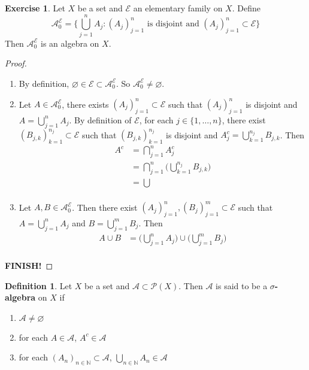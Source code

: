 \documentclass[12pt]{amsart}
\theoremstyle{definition}
\newtheorem{defn}[definition]{Definition}
\newtheorem{ex}[definition]{Exercise}
\newcommand{\N}{\mathbb{N}}
\newcommand{\MA}{\mathcal{A}}
\newcommand{\MP}{\mathcal{P}}
\newcommand{\ME}{\mathcal{E}}
\newcommand{\lex}[1]{\label{ex:#1}}
\newcommand{\ld}[1]{\label{defn:#1}}
\begin{document}
	\begin{ex} \lex{00000} 
	Let $X$ be a set and $\ME$ an elementary family on $X$. Define $$\MA^{\ME}_0 = \bigg \{ \bigcup_{j=1}^n A_j: (A_j)_{j=1}^n \text{ is disjoint and } (A_j)_{j=1}^n \subset \ME \bigg \}$$ Then $\MA^{\ME}_0$ is an algebra on $X$.
	\end{ex}	
	
	\begin{proof}\
	\begin{enumerate}
	\item By definition, $\varnothing \in \ME \subset \MA^{\ME}_0$. So $\MA^{\ME}_0 \neq \varnothing$. 
	\item Let $A \in \MA^{\ME}_0$, there exists $(A_j)_{j=1}^n \subset \ME$ such that $(A_j)_{j=1}^n$ is disjoint and $A = \bigcup\limits_{j =1}^n A_j$. By definition of $\ME$, for each $j \in \{1, \ldots, n\}$, there exist $(B_{j,k})_{k=1}^{n_j} \subset \ME$ such that $(B_{j,k})_{k=1}^{n_j}$ is disjoint and $A_j^c = \bigcup\limits_{k=1}^{n_j}B_{j,k}$. Then 
	\begin{align*}
	A^c 
	&= \bigcap_{j=1}^n A_j^c \\
	&= \bigcap_{j=1}^n \bigg( \bigcup\limits_{k=1}^{n_j}B_{j,k} \bigg)\\
	&= \bigcup\\
\end{align*}	 
	\item Let $A, B \in \MA^{\ME}_0$. Then there exist $(A_j)_{j=1}^n, (B_j)_{j=1}^m \subset \ME$ such that $A = \bigcup\limits_{j=1}^n A_j$ and  $B = \bigcup\limits_{j=1}^m B_j$. Then 
	\begin{align*}
	A \cup B 
	&=  \bigg( \bigcup\limits_{j=1}^n A_j \bigg) \cup \bigg( \bigcup\limits_{j=1}^m B_j \bigg) \\
	\end{align*}
	\end{enumerate}
	\textbf{FINISH!}
	\end{proof}
	
	\begin{defn} \ld{00000} 
		Let $X$ be a set and $\MA \subset \MP(X)$. Then $\MA$ is said to be a $\sigma$\textbf{-algebra} on $X$ if 
		\begin{enumerate}
			\item $\MA \neq \varnothing$
			\item for each $A \in \MA$, $A^c \in \MA$
			\item for each $(A_n)_{n \in \N} \subset \MA$, $\bigcup\limits_{n \in \N}A_n \in \MA$
		\end{enumerate}
	\end{defn}
	
\end{document}
